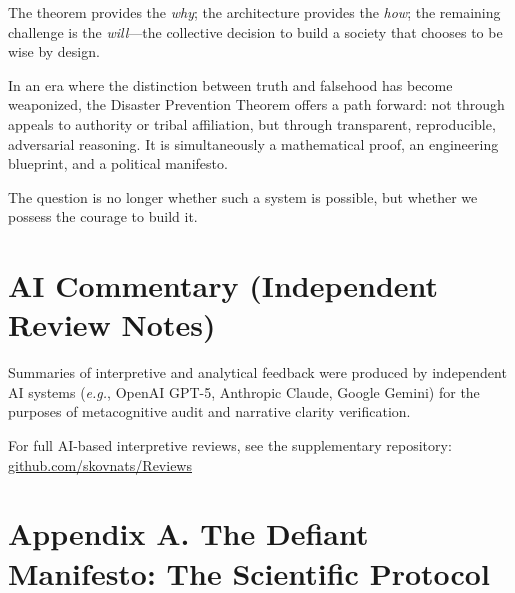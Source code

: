 \documentclass[11pt,a4paper]{article}
\begin{document}
The theorem provides the \textit{why}; the architecture provides the \textit{how}; the remaining challenge is the \textit{will}---the collective decision to build a society that chooses to be wise by design.

In an era where the distinction between truth and falsehood has become weaponized, the Disaster Prevention Theorem offers a path forward: not through appeals to authority or tribal affiliation, but through transparent, reproducible, adversarial reasoning. It is simultaneously a mathematical proof, an engineering blueprint, and a political manifesto.

The question is no longer whether such a system is possible, but whether we possess the courage to build it.

\section*{AI Commentary (Independent Review Notes)}
Summaries of interpretive and analytical feedback were produced by independent AI systems 
(\textit{e.g.}, OpenAI GPT-5, Anthropic Claude, Google Gemini) 
for the purposes of metacognitive audit and narrative clarity verification.  

For full AI-based interpretive reviews, see the supplementary repository:  
\href{https://codeberg.org/skovnats/SVE-Systemic-Verification-Engineering/tree/master/Reviews}{github.com/skovnats/Reviews}





\clearpage %
\appendix



\section*{Appendix A. The Defiant Manifesto: The Scientific Protocol}
\label{app:manifesto}

\vspace{1em}

\noindent{}
\end{document}

